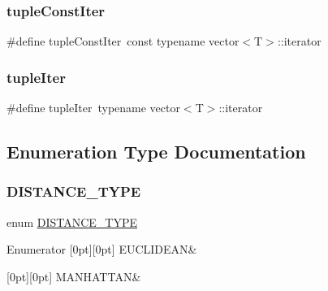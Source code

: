 \subsubsection{\texorpdfstring{tupleConstIter}{tupleConstIter}}
{\footnotesize\ttfamily \#define tuple\+Const\+Iter~const typename vector$<$T$>$\+::iterator}

\mbox{\label{maths_8hh_ad22dcdeefda7d41523cc1604953eb6cc}} 
\subsubsection{\texorpdfstring{tupleIter}{tupleIter}}
{\footnotesize\ttfamily \#define tuple\+Iter~typename vector$<$T$>$\+::iterator}



\subsection{Enumeration Type Documentation}
\mbox{\label{maths_8hh_ac50d7263b1cae8691420b86282b27f90}} 
\subsubsection{\texorpdfstring{DISTANCE\_TYPE}{DISTANCE\_TYPE}}
{\footnotesize\ttfamily enum \mbox{\hyperlink{maths_8hh_ac50d7263b1cae8691420b86282b27f90}{D\+I\+S\+T\+A\+N\+C\+E\+\_\+\+T\+Y\+PE}}}

\begin{DoxyEnumFields}{Enumerator}
[0pt][0pt]{}\mbox{\label{maths_8hh_ac50d7263b1cae8691420b86282b27f90a81bbbc4428c3ff3f1327e94957e2b5f1}} 
E\+U\+C\+L\+I\+D\+E\+AN&\\
\hline

[0pt][0pt]{}\mbox{\label{maths_8hh_ac50d7263b1cae8691420b86282b27f90a9ae95b5995796e7e5f32fa482a5bff98}} 
M\+A\+N\+H\+A\+T\+T\+AN&\\
\hline

\end{DoxyEnumFields}


